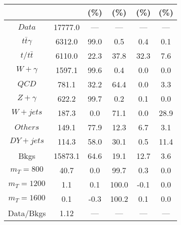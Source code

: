 \begin{figure}
\begin{minipage}[c]{0.32\textwidth}
{\begin{tabular}{cccccc}
 &  & (\%) & (\%) & (\%) & (\%)  \\
\hline
                                                                      $ Data $ &  17777.0 &  --- &  --- &  --- &  ---\\
$ t\bar{t}\gamma $ &  6312.0 &  99.0 &  0.5 &  0.4 &  0.1\\
$ t/t\bar{t} $ &  6110.0 &  22.3 &  37.8 &  32.3 &  7.6\\
$ W+\gamma $ &  1597.1 &  99.6 &  0.4 &  0.0 &  0.0\\
$ QCD $ &  781.1 &  32.2 &  64.4 &  0.0 &  3.3\\
$ Z+\gamma $ &  622.2 &  99.7 &  0.2 &  0.1 &  0.0\\
$ W+jets $ &  187.3 &  0.0 &  71.1 &  0.0 &  28.9\\
$ Others $ &  149.1 &  77.9 &  12.3 &  6.7 &  3.1\\
$ DY+jets $ &  114.3 &  58.0 &  30.1 &  0.5 &  11.4\\
Bkgs &  15873.1 &  64.6 &  19.1 &  12.7 &  3.6\\
$ m_{T} = 800 $ &  40.7 &  0.0 &  99.7 &  0.3 &  0.0\\
$ m_{T} = 1200 $ &  1.1 &  0.1 &  100.0 &  -0.1 &  0.0\\
$ m_{T} = 1600 $ &  0.1 &  -0.3 &  100.2 &  0.1 &  0.0\\
Data/Bkgs &  1.12 &  --- &  --- &  --- &  ---\\
\hline
\end{tabular}
}
\end{minipage}
\end{figure}

